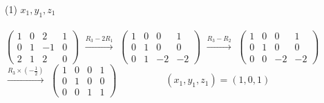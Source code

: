 \documentclass[fleqn]{jsarticle}
\begin{document}
    \begin{description}
		\setlength{\itemsep}{0.5cm}
        \begin{spacing}{1.2}

            \item[(1)]
                $ x_1, y_1, z_1 $ \\\\
                $ \left(
                    \begin{array}{ccc|c}
                        1 & 0 & 2 & 1 \\
                        0 & 1 & -1 & 0 \\
                        2 & 1 & 2 & 0
                    \end{array}
                \right) $
                $ \xrightarrow{R_3-2R_1} $
                $ \left(
                    \begin{array}{ccc|c}
                        1 & 0 & 0 & 1 \\
                        0 & 1 & 0 & 0 \\
                        0 & 1 & -2 & -2
                    \end{array}
                \right) $
                $ \xrightarrow{R_3-R_2} $
                $ \left(
                    \begin{array}{ccc|c}
                        1 & 0 & 0 & 1 \\
                        0 & 1 & 0 & 0 \\
                        0 & 0 & -2 & -2
                    \end{array}
                \right) $\\
                $ \xrightarrow{R_3\times(-\frac{1}{2})} $
                $ \left(
                    \begin{array}{ccc|c}
                        1 & 0 & 0 & 1 \\
                        0 & 1 & 0 & 0 \\
                        0 & 0 & 1 & 1
                    \end{array}
                \right)
                \hspace{60pt}
                (x_1, y_1, z_1) = (1, 0, 1) $


\end{spacing}
\end{description}
\end{document}
